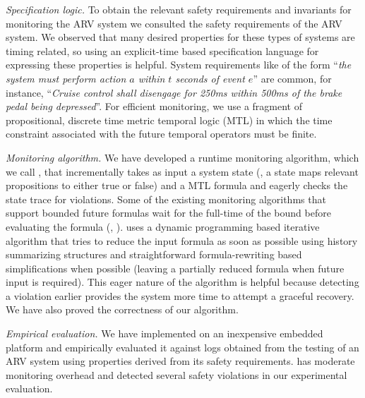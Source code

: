 \noindent
\textit{Specification logic.}
To obtain the relevant safety requirements and invariants for monitoring the ARV system we consulted the safety requirements of the ARV system.
We observed that many desired properties for these types of systems are timing related, so using an explicit-time based specification language for expressing these properties is helpful.
System requirements like
 of the form ``\emph{the system must perform action $a$ within $t$ seconds of event $e$}'' are common,
 for instance,
``\emph{Cruise control shall disengage for 250ms within 500ms of the brake pedal being depressed}''.
%
For efficient monitoring, we use a fragment of propositional, discrete time metric temporal logic (MTL)\cite{Koymans1990} in which the
time constraint
associated with the future temporal operators must be finite. %

\noindent
\textit{Monitoring algorithm.}
We have developed a runtime monitoring algorithm, which we call \monitor, that incrementally takes as input a system state (\ie, a state maps relevant propositions to either true or false) and a MTL formula and eagerly checks the state trace for violations.
Some of the existing monitoring algorithms that support bounded future formulas wait for the full-time of the bound before evaluating the formula (\eg, \cite{Basin2008}).
\monitor uses a dynamic programming based iterative algorithm that tries to reduce the input formula as soon as possible using history summarizing structures and straightforward formula-rewriting based simplifications when possible (leaving a partially reduced formula when future input is required).
This eager nature of the algorithm is helpful because detecting a violation earlier provides the system more time to attempt a graceful recovery.
We have also proved the correctness of our algorithm.

\noindent
\textit{Empirical evaluation.}
We have implemented \monitor on an inexpensive embedded platform and empirically evaluated it against logs obtained from the testing of an ARV system using properties derived from its safety requirements.
\monitor has moderate monitoring overhead and detected several safety violations in our experimental evaluation.




